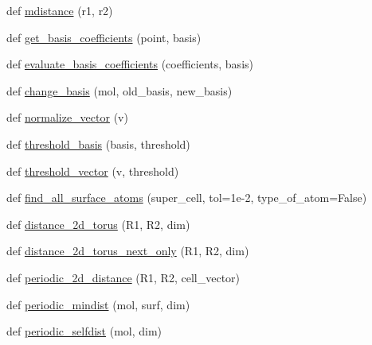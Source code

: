 \begin{DoxyCompactItemize}
\item 
def \hyperlink{namespacemolSimplify_1_1Scripts_1_1cellbuilder__tools_a85ce62198b383899fe614d5d32cfc59d}{mdistance} (r1, r2)
\item 
def \hyperlink{namespacemolSimplify_1_1Scripts_1_1cellbuilder__tools_a63c23a5bae677e610446b31f2eaca522}{get\+\_\+basis\+\_\+coefficients} (point, basis)
\item 
def \hyperlink{namespacemolSimplify_1_1Scripts_1_1cellbuilder__tools_acb88f739d432f6528c039e2131f212a1}{evaluate\+\_\+basis\+\_\+coefficients} (coefficients, basis)
\item 
def \hyperlink{namespacemolSimplify_1_1Scripts_1_1cellbuilder__tools_a188141938d45da5b263a09ad3b5606cd}{change\+\_\+basis} (mol, old\+\_\+basis, new\+\_\+basis)
\item 
def \hyperlink{namespacemolSimplify_1_1Scripts_1_1cellbuilder__tools_acc8a403378889582969b9c7f3ca7500e}{normalize\+\_\+vector} (v)
\item 
def \hyperlink{namespacemolSimplify_1_1Scripts_1_1cellbuilder__tools_a2fcf4ae7cb93845bad8e004ca7453c91}{threshold\+\_\+basis} (basis, threshold)
\item 
def \hyperlink{namespacemolSimplify_1_1Scripts_1_1cellbuilder__tools_a9dc8102730a26e44c0000e26083b03fa}{threshold\+\_\+vector} (v, threshold)
\item 
def \hyperlink{namespacemolSimplify_1_1Scripts_1_1cellbuilder__tools_a79ad9949a6d1245131a2100397dc1c5e}{find\+\_\+all\+\_\+surface\+\_\+atoms} (super\+\_\+cell, tol=1e-\/2, type\+\_\+of\+\_\+atom=\+False)
\item 
def \hyperlink{namespacemolSimplify_1_1Scripts_1_1cellbuilder__tools_afbb5e3a574b01b5453cde7480935274a}{distance\+\_\+2d\+\_\+torus} (R1, R2, dim)
\item 
def \hyperlink{namespacemolSimplify_1_1Scripts_1_1cellbuilder__tools_ad2d18e2318556932990c9262691c1d91}{distance\+\_\+2d\+\_\+torus\+\_\+next\+\_\+only} (R1, R2, dim)
\item 
def \hyperlink{namespacemolSimplify_1_1Scripts_1_1cellbuilder__tools_a862c53597bbd8f918f5a77cf5438aac8}{periodic\+\_\+2d\+\_\+distance} (R1, R2, cell\+\_\+vector)
\item 
def \hyperlink{namespacemolSimplify_1_1Scripts_1_1cellbuilder__tools_a2adb772a7c2390ca7c3b0e5dea3fc783}{periodic\+\_\+mindist} (mol, surf, dim)
\item 
def \hyperlink{namespacemolSimplify_1_1Scripts_1_1cellbuilder__tools_acb746c95cfe67c96ae6373e417eab2e7}{periodic\+\_\+selfdist} (mol, dim)
\item 

\end{DoxyCompactItemize}
